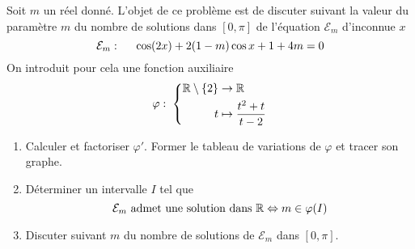 Soit $m$ un réel donné. L'objet de ce problème est de discuter suivant la valeur du paramètre $m$ du nombre de solutions dans $[0, \pi]$ de l'équation $\mathcal{E}_m$ d'inconnue $x$
\begin{displaymath}
  \mathcal{E}_m:\hspace{0.5cm} \cos(2x) + 2(1-m)\cos x +1 +4m = 0 
\end{displaymath}
On introduit pour cela une fonction auxiliaire
\begin{displaymath}
  \varphi:\;
\left\lbrace 
\begin{aligned}
  \mathbb{R} \setminus\{2\} &\rightarrow \mathbb{R} \\
  t &\mapsto \frac{t^2 + t}{t-2}
\end{aligned}
\right. 
\end{displaymath}

\begin{enumerate}
  \item Calculer et factoriser $\varphi'$. Former le tableau de variations de $\varphi$ et tracer son graphe.
  \item Déterminer un intervalle $I$ tel que
  \begin{displaymath}
    \mathcal{E}_m \text{ admet une solution dans $\mathbb{R}$} \Leftrightarrow m \in \varphi(I)
  \end{displaymath}
  \item Discuter suivant $m$ du nombre de solutions de $\mathcal{E}_m$ dans $[0,\pi]$.
\end{enumerate}
